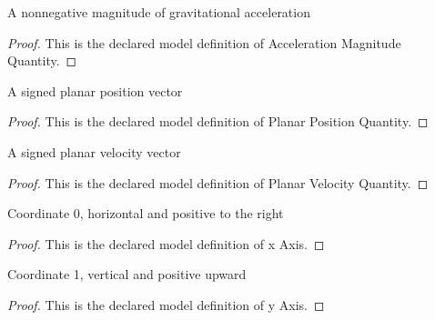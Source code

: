 \begin{definition}
  \label{def:physics:phyx-mini-0796:phyxminiproblems-problemphyxmini0796-accelerationmagnitudequantity}
  A nonnegative magnitude of gravitational acceleration
\end{definition}
\begin{proof}
  This is the declared model definition of Acceleration Magnitude Quantity.
\end{proof}
\begin{definition}
  \label{def:physics:phyx-mini-0796:phyxminiproblems-problemphyxmini0796-planarpositionquantity}
  A signed planar position vector
\end{definition}
\begin{proof}
  This is the declared model definition of Planar Position Quantity.
\end{proof}
\begin{definition}
  \label{def:physics:phyx-mini-0796:phyxminiproblems-problemphyxmini0796-planarvelocityquantity}
  A signed planar velocity vector
\end{definition}
\begin{proof}
  This is the declared model definition of Planar Velocity Quantity.
\end{proof}
\begin{definition}[x Axis]
  \label{def:physics:phyx-mini-0796:phyxminiproblems-problemphyxmini0796-xaxis}
  Coordinate 0, horizontal and positive to the right
\end{definition}
\begin{proof}
  This is the declared model definition of x Axis.
\end{proof}
\begin{definition}[y Axis]
  \label{def:physics:phyx-mini-0796:phyxminiproblems-problemphyxmini0796-yaxis}
  Coordinate 1, vertical and positive upward
\end{definition}
\begin{proof}
  This is the declared model definition of y Axis.
\end{proof}
